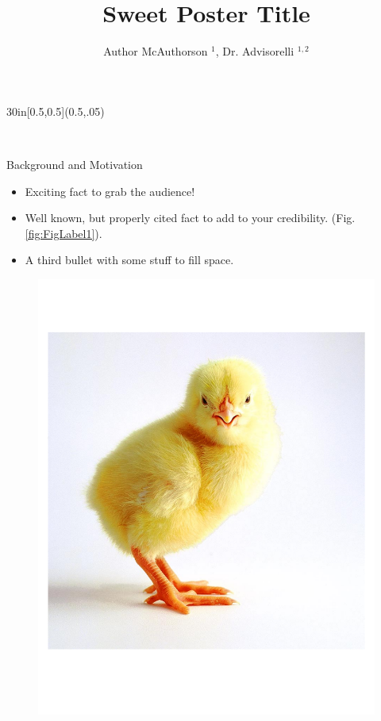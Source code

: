 \documentclass[final]{beamer}
\title{Sweet Poster Title}
\author[]{Author McAuthorson $^1$, Dr. Advisorelli $^{1,2}$}
\institute[]{University of Michigan,$^1$Dept. of Epicness, $^2$Dept. of Sammiches }
\date{}
\begin{document}
  \begin{frame}[plain]{} 
    \begin{center}

      \begin{textblock*}{30in}[0.5,0.5](0.5\paperwidth,.05\paperheight)
         \maketitle
      \end{textblock*}
      \vspace*{7.5cm}
	

      \begin{minipage}[t]{.23\linewidth}
	{\LARGE {}}\\	
	\begin{block}{\Large Background and Motivation}
	\begin{itemize}
	\item Exciting fact to grab the audience!
	\item Well known, but properly cited fact to add to your credibility. (Fig.\,\ref{fig:FigLabel1}).
	\item A third bullet with some stuff to fill space.
	\end{itemize}
	  \begin{center}
	    \begin{minipage}{1\linewidth}
	  \begin{figure} \def\figurename{Fig.}
	    \centering
	    \includegraphics[width=.9\textwidth,trim = 0cm 3cm 0cm 2cm, clip]{./figs/Chicken}

\end{figure}
\end{minipage}
\end{center}
\end{block}
\end{minipage}
\end{center}
\end{frame}
\end{document}
